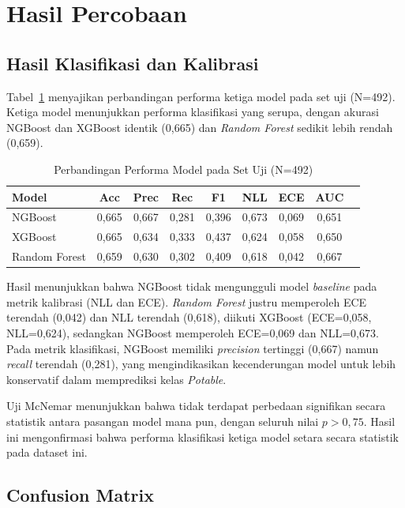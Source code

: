 \documentclass[metlit,article,accept,pdftex,moreauthors]{Definitions/mdpi}
\begin{document}
\section{Hasil Percobaan}

\subsection{Hasil Klasifikasi dan Kalibrasi}

Tabel~\ref{tab:hasil_utama} menyajikan perbandingan performa ketiga model pada set uji (N=492). Ketiga model menunjukkan performa klasifikasi yang serupa, dengan akurasi NGBoost dan XGBoost identik (0,665) dan \textit{Random Forest} sedikit lebih rendah (0,659).

\begin{table}[H]
\centering
\caption{Perbandingan Performa Model pada Set Uji (N=492)}
\label{tab:hasil_utama}
\begin{tabular}{@{}lcccccccc@{}}
\toprule
\textbf{Model} & \textbf{Acc} & \textbf{Prec} & \textbf{Rec} & \textbf{F1} & \textbf{NLL} & \textbf{ECE} & \textbf{AUC} \\ \midrule
NGBoost & 0,665 & 0,667 & 0,281 & 0,396 & 0,673 & 0,069 & 0,651 \\
XGBoost & 0,665 & 0,634 & 0,333 & 0,437 & 0,624 & 0,058 & 0,650 \\
Random Forest & 0,659 & 0,630 & 0,302 & 0,409 & 0,618 & 0,042 & 0,667 \\ \bottomrule
\end{tabular}
\end{table}

Hasil menunjukkan bahwa NGBoost tidak mengungguli model \textit{baseline} pada metrik kalibrasi (NLL dan ECE). \textit{Random Forest} justru memperoleh ECE terendah (0,042) dan NLL terendah (0,618), diikuti XGBoost (ECE=0,058, NLL=0,624), sedangkan NGBoost memperoleh ECE=0,069 dan NLL=0,673. Pada metrik klasifikasi, NGBoost memiliki \textit{precision} tertinggi (0,667) namun \textit{recall} terendah (0,281), yang mengindikasikan kecenderungan model untuk lebih konservatif dalam memprediksi kelas \textit{Potable}.

Uji McNemar menunjukkan bahwa tidak terdapat perbedaan signifikan secara statistik antara pasangan model mana pun, dengan seluruh nilai $p > 0,75$. Hasil ini mengonfirmasi bahwa performa klasifikasi ketiga model setara secara statistik pada dataset ini.

\subsection{Confusion Matrix}
\end{document}
